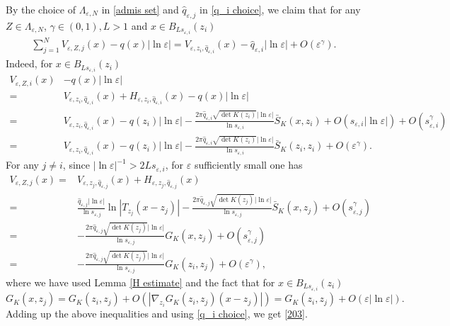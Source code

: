 \documentclass[12pt,reqno]{amsart}
\numberwithin{equation}{section}
\theoremstyle{definition}
\theoremstyle{remark}
\begin{document}
By the choice of $ \Lambda_{\varepsilon, N} $ in \eqref{admis set} and  $ \hat{q}_{\varepsilon,j} $ in \eqref{q_i choice}, we claim that for any $ Z\in \Lambda_{\varepsilon, N} $, $ \gamma\in(0,1), L>1 $ and $ x\in B_{Ls_{\varepsilon,i}}(z_i) $
\begin{equation}\label{203}
\begin{split}
\sum_{j=1}^NV_{\varepsilon, Z,j}(x)-q(x)|\ln\varepsilon|=V_{\varepsilon, z_i, \hat{q}_{\varepsilon,i}}(x)-\hat{q}_{\varepsilon,i}|\ln\varepsilon|+O\left( \varepsilon^\gamma\right).
\end{split}
\end{equation}
Indeed, for $ x\in B_{Ls_{\varepsilon,i}}(z_i) $
\begin{equation*}
\begin{split}
V_{\varepsilon,Z,i}(x)&-q(x)|\ln\varepsilon|\\
=&V_{\varepsilon, z_i, \hat{q}_{\varepsilon,i}}(x)+H_{\varepsilon, z_i, \hat{q}_{\varepsilon,i}}(x)-q(x)|\ln\varepsilon|\\
=&V_{\varepsilon, z_i, \hat{q}_{\varepsilon,i}}(x)-q(z_i)|\ln\varepsilon|-\frac{2\pi\hat{q}_{\varepsilon,i}\sqrt{\det K(z_i)}|\ln\varepsilon|}{\ln s_{\varepsilon,i}}\bar{S}_K(x, z_i)+O(s_{\varepsilon,i}|\ln\varepsilon|)+O\left( s_{\varepsilon,i}^{\gamma}\right) \\
=&V_{\varepsilon, z_i, \hat{q}_{\varepsilon,i}}(x)-q(z_i)|\ln\varepsilon|-\frac{2\pi\hat{q}_{\varepsilon,i}\sqrt{\det K(z_i)}|\ln\varepsilon|}{\ln s_{\varepsilon,i}}\bar{S}_K(z_i, z_i)+ O\left( \varepsilon^\gamma\right).
\end{split}
\end{equation*}
For any $ j\neq i $, since $ |\ln\varepsilon|^{-1}>2Ls_{\varepsilon,i} $, for $ \varepsilon $ sufficiently small  one has
\begin{equation*}
\begin{split}
V_{\varepsilon,Z,j}(x)=&V_{\varepsilon, z_j, \hat{q}_{\varepsilon,j}}(x)+H_{\varepsilon, z_j, \hat{q}_{\varepsilon,j}}(x)\\
=&\frac{\hat{q}_{\varepsilon,j}|\ln\varepsilon|}{\ln s_{\varepsilon,j}}\ln |T_{z_j}(x-z_j)|-\frac{2\pi\hat{q}_{\varepsilon,j}\sqrt{\det K(z_j)}|\ln\varepsilon|}{\ln s_{\varepsilon,j}}\bar{S}_K(x, z_j)+O\left(  s_{\varepsilon,j}^{\gamma}\right)\\
=&-\frac{2\pi\hat{q}_{\varepsilon,j}\sqrt{\det K(z_j)}|\ln\varepsilon|}{\ln s_{\varepsilon,j}}G_K(x, z_j)+O\left(  s_{\varepsilon,j}^{\gamma}\right) \\
=&-\frac{2\pi\hat{q}_{\varepsilon,j}\sqrt{\det K(z_j)}|\ln\varepsilon|}{\ln s_{\varepsilon,j}}G_K(z_i, z_j)+O\left( \varepsilon^\gamma\right),
\end{split}
\end{equation*}
where we have used  Lemma \ref{H estimate} and the fact that  for $ x\in B_{Ls_{\varepsilon,i}}(z_i) $
\begin{equation*}
G_K(x, z_j)=G_K(z_i, z_j)+O(|\nabla_{z_i}G_K(z_i, z_j)(x-z_j)|)=G_K(z_i, z_j)+O(\varepsilon|\ln\varepsilon|).
\end{equation*}
Adding up the above inequalities and using \eqref{q_i choice}, we get \eqref{203}.
\end{document}
